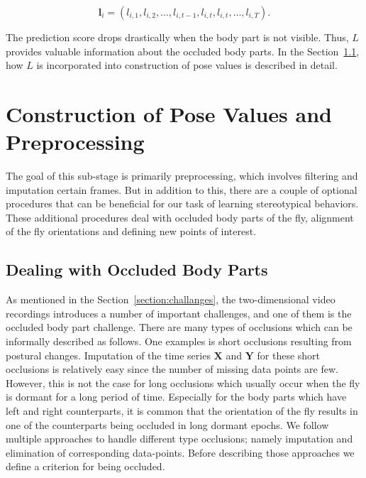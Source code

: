 \begin{equation*}
	\mathbf{l}_i = (l_{i,1}, l_{i,2}, \dots, l_{i,t-1}, l_{i,t}, l_{i,t}, \dots, l_{i,T}).
\end{equation*}

The prediction score drops drastically when the body part is not visible. Thus, $L$ provides valuable information about the occluded body parts. In the Section~\ref{section:dealing-with-occluded-body-parts}, how $L$ is incorporated into construction of pose values is described in detail.

\section{Construction of Pose Values and Preprocessing}
The goal of this sub-stage is primarily preprocessing, which involves filtering and imputation certain frames.
But in addition to this, there are a couple of optional procedures that can be beneficial for our task of learning stereotypical behaviors.
These additional procedures deal with occluded body parts of the fly, alignment of the fly orientations and defining new points of interest.

\subsection{Dealing with Occluded Body Parts}\label{section:dealing-with-occluded-body-parts}
As mentioned in the Section~\ref{section:challanges}, the two-dimensional video recordings introduces a number of important challenges, and one of them is the occluded body part challenge.
There are many types of occlusions which can be informally described as follows.
One examples is short occlusions resulting from postural changes.
Imputation of the time series $\mathbf{X}$ and $\mathbf{Y}$ for these short occlusions is relatively easy since the number of missing data points are  few.
However, this is not the case for long occlusions which usually occur when the fly is dormant for a long period of time.
Especially for the body parts which have left and right counterparts, it is common that the orientation of the fly results in one of the counterparts being occluded in long dormant epochs.
We follow multiple approaches to handle different type occlusions; namely imputation and elimination of corresponding data-points.
Before describing those approaches we define a criterion for being occluded.

